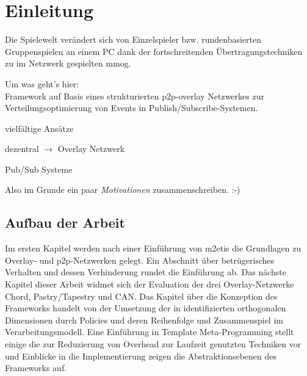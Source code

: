 \chapter{Einleitung}
\label{chap:einleitung}

Die Spielewelt verändert sich von Einzelspieler bzw. rundenbasierten Gruppenspielen an einem PC dank der fortschreitenden Übertragungstechniken zu im Netzwerk gespielten \ac{mmog}.

Um was geht's hier:\\
Framework auf Basis eines strukturierten p2p-overlay Netzwerkes zur Verteilungsoptimierung von Events in Publish/Subscribe-Systemen.

\begin{itemize*}
\item vielfältige Ansätze \cite{Bharambe2008Donnybrook} %
\item dezentral $\rightarrow$ Overlay Netzwerk
\item Pub/Sub Systeme \cite{Knutsson2004Peertopeer, Triebel2008Peertopeer} %
\end{itemize*}

Also im Grunde ein paar \emph{Motivationen} zusammenschreiben. :-)

\cite{Fischer2010Event, Fischer2010a} %

\section{Aufbau der Arbeit}
Im ersten Kapitel werden nach einer Einführung von \ac{m2etis} die Grundlagen zu Overlay- und p2p-Netzwerken gelegt. Ein Abschnitt über betrügerisches Verhalten und dessen Verhinderung rundet die Einführung ab. Das nächste Kapitel dieser Arbeit widmet sich der Evaluation der drei Overlay-Netzwerke Chord, Pastry/Tapestry und CAN. Das Kapitel über die Konzeption des Frameworks handelt von der Umsetzung der in \cite{Fischer2010Event} identifizierten orthogonalen Dimensionen durch Policies und deren Reihenfolge und Zusammenspiel im Verarbeitungsmodell. Eine Einführung in Template Meta-Programming stellt einige die zur Reduzierung von Overhead zur Laufzeit genutzten Techniken vor und Einblicke in die Implementierung zeigen die Abstraktionsebenen des Frameworks auf.
